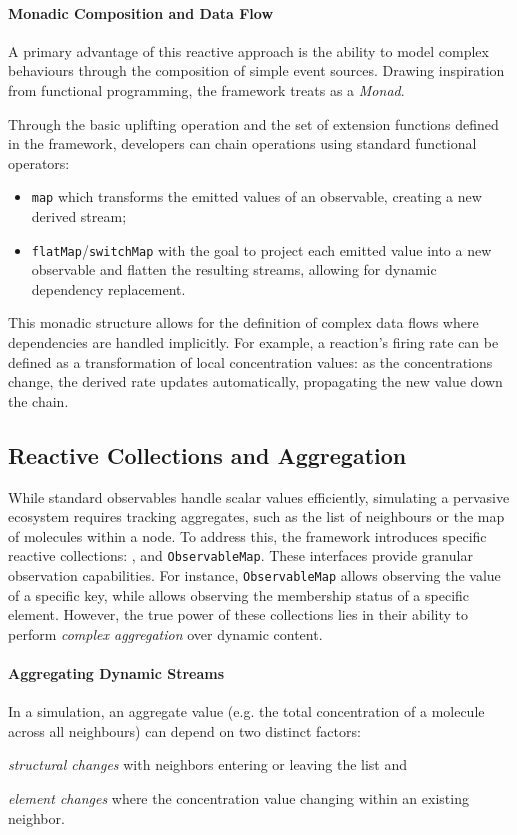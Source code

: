 \paragraph{Monadic Composition and Data Flow}
A primary advantage of this reactive approach is the ability to model complex
behaviours through the composition of simple event sources. Drawing inspiration
from functional programming, the framework treats  as a
\emph{Monad}.

Through the basic uplifting operation  and the set of extension
functions defined in the framework, developers can chain operations using
standard functional operators:
\begin{itemize}
	\item \texttt{map} which transforms the emitted values of an observable,
	      creating a new derived stream;
	\item \texttt{flatMap}/\texttt{switchMap} with the goal to project each
	      emitted value into a new observable and flatten the resulting streams,
	      allowing for dynamic dependency replacement.
\end{itemize}
This monadic structure allows for the definition of complex data flows where
dependencies are handled implicitly. For example, a reaction's firing rate can
be defined as a transformation of local concentration values: as the
concentrations change, the derived rate updates automatically, propagating the
new value down the chain.

\subsection{Reactive Collections and Aggregation}
While standard observables handle scalar values efficiently, simulating a
pervasive ecosystem requires tracking aggregates, such as the list of
neighbours or the map of molecules within a node. To address this, the
framework introduces specific reactive collections: ,
 and \texttt{ObservableMap}.
These interfaces provide granular observation capabilities. For instance,
\mbox{\texttt{ObservableMap}} allows observing the value of a specific key, while
 allows observing the membership status of a specific
element. However, the true power of these collections lies in their ability to
perform \emph{complex aggregation} over dynamic content.

\paragraph{Aggregating Dynamic Streams}
In a simulation, an aggregate value (e.g. the total concentration of a
molecule across all neighbours) can depend on two distinct factors:
\begin{enumerate*}[label=(\roman*)]
	\item \emph{structural changes} with neighbors entering or leaving the list
	      and
	\item \emph{element changes} where the concentration value changing within
	      an existing neighbor.
\end{enumerate*}


